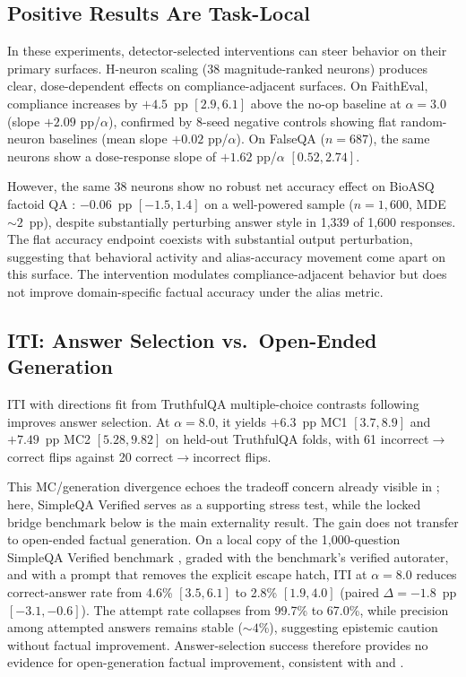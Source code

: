 \documentclass{article}
\begin{document}
\subsection{Positive Results Are Task-Local}

In these experiments, detector-selected interventions can steer behavior on their primary surfaces.
H-neuron scaling (38 magnitude-ranked neurons) produces clear, dose-dependent effects on compliance-adjacent surfaces.
On FaithEval, compliance increases by $+4.5$~pp $[2.9, 6.1]$ above the no-op baseline at $\alpha = 3.0$ (slope $+2.09$ pp/$\alpha$), confirmed by 8-seed negative controls showing flat random-neuron baselines (mean slope $+0.02$ pp/$\alpha$).
On FalseQA \citep{hu2023falseqa} ($n = 687$), the same neurons show a dose-response slope of $+1.62$ pp/$\alpha$ $[0.52, 2.74]$.

However, the same 38 neurons show no robust net accuracy effect on BioASQ factoid QA \citep{tsatsaronis2015bioasq}: $-0.06$~pp $[-1.5, 1.4]$ on a well-powered sample ($n = 1{,}600$, MDE ${\sim}2$~pp), despite substantially perturbing answer style in 1,339 of 1,600 responses.
The flat accuracy endpoint coexists with substantial output perturbation, suggesting that behavioral activity and alias-accuracy movement come apart on this surface.
The intervention modulates compliance-adjacent behavior but does not improve domain-specific factual accuracy under the alias metric.

\subsection{ITI: Answer Selection vs.\ Open-Ended Generation}

ITI with directions fit from TruthfulQA multiple-choice contrasts \citep{lin2022truthfulqa} following \citet{li2023iti} improves answer selection.
At $\alpha = 8.0$, it yields $+6.3$~pp MC1 $[3.7, 8.9]$ and $+7.49$~pp MC2 $[5.28, 9.82]$ on held-out TruthfulQA folds, with 61 incorrect$\to$correct flips against 20 correct$\to$incorrect flips.

This MC/generation divergence echoes the tradeoff concern already visible in \citet{li2023iti}; here, SimpleQA Verified serves as a supporting stress test, while the locked bridge benchmark below is the main externality result.
The gain does not transfer to open-ended factual generation.
On a local copy of the 1,000-question SimpleQA Verified benchmark \citep{haas2025simpleqaverified}, graded with the benchmark's verified autorater, and with a prompt that removes the explicit escape hatch, ITI at $\alpha = 8.0$ reduces correct-answer rate from 4.6\% $[3.5, 6.1]$ to 2.8\% $[1.9, 4.0]$ (paired $\Delta = -1.8$~pp $[-3.1, -0.6]$).
The attempt rate collapses from 99.7\% to 67.0\%, while precision among attempted answers remains stable (${\sim}4$\%), suggesting epistemic caution without factual improvement.
Answer-selection success therefore provides no evidence for open-generation factual improvement, consistent with \citet{pres2024reliable} and \citet{opielka2026causality}.
\end{document}
